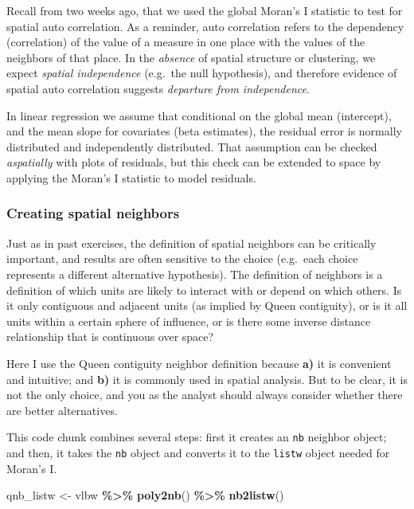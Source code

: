 \documentclass[
]{book}
\newenvironment{Shaded}{\begin{snugshade}}{\end{snugshade}}
\newcommand{\FunctionTok}[1]{\textcolor[rgb]{0.13,0.29,0.53}{\textbf{#1}}}
\newcommand{\NormalTok}[1]{#1}
\newcommand{\OtherTok}[1]{\textcolor[rgb]{0.56,0.35,0.01}{#1}}
\newcommand{\SpecialCharTok}[1]{\textcolor[rgb]{0.81,0.36,0.00}{\textbf{#1}}}
\begin{document}
Recall from two weeks ago, that we used the global Moran's I statistic to test for spatial auto correlation. As a reminder, auto correlation refers to the dependency (correlation) of the value of a measure in one place with the values of the neighbors of that place. In the \emph{absence} of spatial structure or clustering, we expect \emph{spatial independence} (e.g.~the null hypothesis), and therefore evidence of spatial auto correlation suggests \emph{departure from independence}.

In linear regression we assume that conditional on the global mean (intercept), and the mean slope for covariates (beta estimates), the residual error is normally distributed and independently distributed. That assumption can be checked \emph{aspatially} with plots of residuals, but this check can be extended to space by applying the Moran's I statistic to model residuals.

\hypertarget{creating-spatial-neighbors}{%
\subsubsection{Creating spatial neighbors}\label{creating-spatial-neighbors}}

Just as in past exercises, the definition of spatial neighbors can be critically important, and results are often sensitive to the choice (e.g.~each choice represents a different alternative hypothesis). The definition of neighbors is a definition of which units are likely to interact with or depend on which others. Is it only contiguous and adjacent units (as implied by Queen contiguity), or is it all units within a certain sphere of influence, or is there some inverse distance relationship that is continuous over space?

Here I use the Queen contiguity neighbor definition because \textbf{a)} it is convenient and intuitive; and \textbf{b)} it is commonly used in spatial analysis. But to be clear, it is not the only choice, and you as the analyst should always consider whether there are better alternatives.

This code chunk combines several steps: first it creates an \texttt{nb} neighbor object; and then, it takes the \texttt{nb} object and converts it to the \texttt{listw} object needed for Moran's I.

\begin{Shaded}
\begin{Highlighting}[]
\NormalTok{qnb\_listw }\OtherTok{\textless{}{-}}\NormalTok{ vlbw }\SpecialCharTok{\%\textgreater{}\%}
  \FunctionTok{poly2nb}\NormalTok{() }\SpecialCharTok{\%\textgreater{}\%}
  \FunctionTok{nb2listw}\NormalTok{()}
\end{Highlighting}
\end{Shaded}
\end{document}
